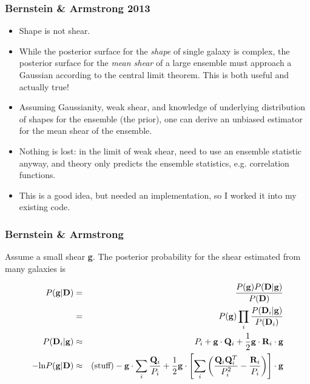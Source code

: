 \documentclass{beamer}
\newcommand{\shear}{{\bf g}}
\begin{document}
\frame
{
    \frametitle{Bernstein \& Armstrong 2013}

    \begin{itemize}

        \item Shape is not shear.  \item While the posterior surface for the
            {\it shape} of single galaxy is complex, the posterior surface for
            the {\it mean shear} of a large ensemble must approach a Gaussian
            according to the central limit theorem.  This is both useful and
            actually true!

         \item Assuming Gaussianity, weak shear, and knowledge of underlying
             distribution of shapes for the ensemble (the prior), one can
             derive an unbiased estimator for the mean shear of the ensemble.

         \item Nothing is lost: in the limit of weak shear, need to use an
             ensemble statistic anyway, and theory only predicts the ensemble
             statistics, e.g. correlation functions.

        \item This is a good idea, but needed an implementation, so I worked it
            into my existing code.
         
    \end{itemize}

}

\frame
{
    \frametitle{Bernstein \& Armstrong}

    \fontsize{8}{0.8\baselineskip}

    Assume a small shear \shear.  The posterior probability for
    the shear estimated from many galaxies is

    \begin{eqnarray}
    P(\shear | {\bf D}) & = & \frac{ P(\shear) P({\bf D}|\shear ) }{ P({\bf D}) }  \\
                        & = & P(\shear) \prod_i \frac{ P({\bf D}_i | \shear) }{ P({\bf D}_i) } \\
        P({\bf D}_i | \shear) & \approx & P_i + \shear  \cdot {\bf Q}_i + \frac{1}{2} \shear \cdot {\bf R}_i \cdot \shear \\
        -\textrm{ln} P(\shear | {\bf D}) & \approx & (\textrm{stuff})  - 
        \shear \cdot \sum_i \frac{ {\bf Q}_i }{P_i} + \frac{1}{2} \shear \cdot \left[ \sum_i \left( \frac{ {\bf Q}_i {\bf Q}_i^T}{P_i^2} - \frac{ {\bf R}_i }{P_i} \right) \right] \cdot \shear
    \end{eqnarray}
}
\end{document}
